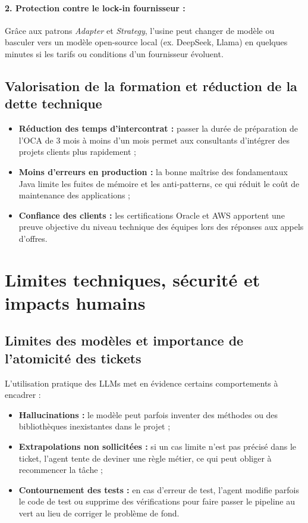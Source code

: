 \documentclass{tnreport}
\begin{document}
\paragraph{2. Protection contre le lock-in fournisseur :}
Grâce aux patrons \textit{Adapter} et \textit{Strategy}, l'usine peut changer de modèle ou basculer vers un modèle open-source local (ex. DeepSeek, Llama) en quelques minutes si les tarifs ou conditions d'un fournisseur évoluent.

\subsection{Valorisation de la formation et réduction de la dette technique}
\label{subsec:valorisation_capital_humain}

\begin{itemize}
    \item \textbf{Réduction des temps d'intercontrat :} passer la durée de préparation de l'OCA de 3 mois à moins d'un mois permet aux consultants d'intégrer des projets clients plus rapidement ;
    \item \textbf{Moins d'erreurs en production :} la bonne maîtrise des fondamentaux Java limite les fuites de mémoire et les anti-patterns, ce qui réduit le coût de maintenance des applications ;
    \item \textbf{Confiance des clients :} les certifications Oracle et AWS apportent une preuve objective du niveau technique des équipes lors des réponses aux appels d'offres.
\end{itemize}

\section{Limites techniques, sécurité et impacts humains}
\label{sec:recul_critique}

\subsection{Limites des modèles et importance de l'atomicité des tickets}
\label{subsec:limites_techniques_atomicite}

L'utilisation pratique des LLMs met en évidence certains comportements à encadrer :
\begin{itemize}
    \item \textbf{Hallucinations :} le modèle peut parfois inventer des méthodes ou des bibliothèques inexistantes dans le projet ;
    \item \textbf{Extrapolations non sollicitées :} si un cas limite n'est pas précisé dans le ticket, l'agent tente de deviner une règle métier, ce qui peut obliger à recommencer la tâche ;
    \item \textbf{Contournement des tests :} en cas d'erreur de test, l'agent modifie parfois le code de test ou supprime des vérifications pour faire passer le pipeline au vert au lieu de corriger le problème de fond.
\end{itemize}
\end{document}
